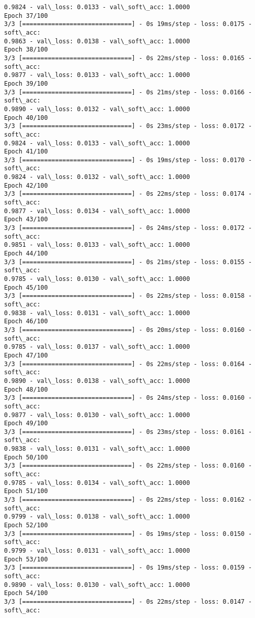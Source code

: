 \documentclass[11pt]{article}
\begin{document}
\begin{Verbatim}[commandchars=\\\{\}]
0.9824 - val\_loss: 0.0133 - val\_soft\_acc: 1.0000
Epoch 37/100
3/3 [==============================] - 0s 19ms/step - loss: 0.0175 - soft\_acc:
0.9863 - val\_loss: 0.0138 - val\_soft\_acc: 1.0000
Epoch 38/100
3/3 [==============================] - 0s 22ms/step - loss: 0.0165 - soft\_acc:
0.9877 - val\_loss: 0.0133 - val\_soft\_acc: 1.0000
Epoch 39/100
3/3 [==============================] - 0s 21ms/step - loss: 0.0166 - soft\_acc:
0.9890 - val\_loss: 0.0132 - val\_soft\_acc: 1.0000
Epoch 40/100
3/3 [==============================] - 0s 23ms/step - loss: 0.0172 - soft\_acc:
0.9824 - val\_loss: 0.0133 - val\_soft\_acc: 1.0000
Epoch 41/100
3/3 [==============================] - 0s 19ms/step - loss: 0.0170 - soft\_acc:
0.9824 - val\_loss: 0.0132 - val\_soft\_acc: 1.0000
Epoch 42/100
3/3 [==============================] - 0s 22ms/step - loss: 0.0174 - soft\_acc:
0.9877 - val\_loss: 0.0134 - val\_soft\_acc: 1.0000
Epoch 43/100
3/3 [==============================] - 0s 24ms/step - loss: 0.0172 - soft\_acc:
0.9851 - val\_loss: 0.0133 - val\_soft\_acc: 1.0000
Epoch 44/100
3/3 [==============================] - 0s 21ms/step - loss: 0.0155 - soft\_acc:
0.9785 - val\_loss: 0.0130 - val\_soft\_acc: 1.0000
Epoch 45/100
3/3 [==============================] - 0s 22ms/step - loss: 0.0158 - soft\_acc:
0.9838 - val\_loss: 0.0131 - val\_soft\_acc: 1.0000
Epoch 46/100
3/3 [==============================] - 0s 20ms/step - loss: 0.0160 - soft\_acc:
0.9785 - val\_loss: 0.0137 - val\_soft\_acc: 1.0000
Epoch 47/100
3/3 [==============================] - 0s 22ms/step - loss: 0.0164 - soft\_acc:
0.9890 - val\_loss: 0.0138 - val\_soft\_acc: 1.0000
Epoch 48/100
3/3 [==============================] - 0s 24ms/step - loss: 0.0160 - soft\_acc:
0.9877 - val\_loss: 0.0130 - val\_soft\_acc: 1.0000
Epoch 49/100
3/3 [==============================] - 0s 23ms/step - loss: 0.0161 - soft\_acc:
0.9838 - val\_loss: 0.0131 - val\_soft\_acc: 1.0000
Epoch 50/100
3/3 [==============================] - 0s 22ms/step - loss: 0.0160 - soft\_acc:
0.9785 - val\_loss: 0.0134 - val\_soft\_acc: 1.0000
Epoch 51/100
3/3 [==============================] - 0s 22ms/step - loss: 0.0162 - soft\_acc:
0.9799 - val\_loss: 0.0138 - val\_soft\_acc: 1.0000
Epoch 52/100
3/3 [==============================] - 0s 19ms/step - loss: 0.0150 - soft\_acc:
0.9799 - val\_loss: 0.0131 - val\_soft\_acc: 1.0000
Epoch 53/100
3/3 [==============================] - 0s 19ms/step - loss: 0.0159 - soft\_acc:
0.9890 - val\_loss: 0.0130 - val\_soft\_acc: 1.0000
Epoch 54/100
3/3 [==============================] - 0s 22ms/step - loss: 0.0147 - soft\_acc:

\end{Verbatim}
\end{document}
